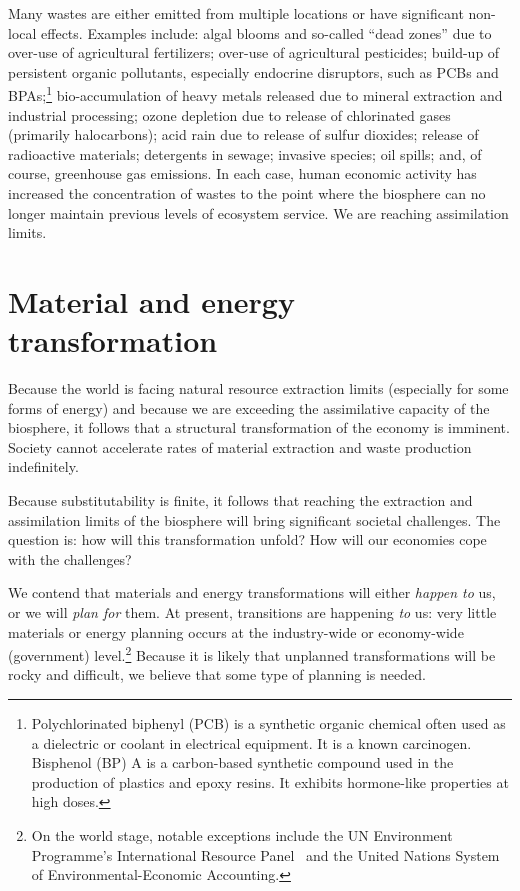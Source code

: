 Many wastes are either emitted from multiple locations or have 
significant non-local effects. 
Examples include:
algal blooms and so-called ``dead zones'' due to over-use of agricultural fertilizers;
over-use of agricultural pesticides;
build-up of persistent organic pollutants, especially endocrine disruptors, such as PCBs 
	and BPAs;\footnote{Polychlorinated biphenyl (PCB) 
		is a synthetic organic chemical often used as 
		a dielectric or coolant in electrical equipment.
		It is a known carcinogen.
		Bisphenol (BP) A is a carbon-based synthetic compound used in the production
		of plastics and epoxy resins. It exhibits hormone-like properties at high doses.
		}
bio-accumulation of heavy metals released due to mineral extraction and industrial processing;
ozone depletion due to release of chlorinated gases (primarily halocarbons);
acid rain due to release of sulfur dioxides;
release of radioactive materials;
detergents in sewage;
invasive species;
oil spills;
and, of course, greenhouse gas emissions.\cite{UNMEA2005, Butler1978, Walker2012}
In each case, human economic activity has increased the concentration
of wastes to the point where the biosphere can no longer maintain 
previous levels of ecosystem service.
We are reaching assimilation limits.


\section{Material and energy transformation}

Because the world is facing natural resource extraction limits
(especially for some forms of energy)
and because we are exceeding the assimilative capacity of the biosphere,
it follows that a structural transformation of the economy is imminent.
Society cannot accelerate rates of material extraction
and waste production indefinitely.

Because substitutability is finite, 
it follows that reaching the extraction and assimilation limits 
of the biosphere will bring significant societal challenges.
The question is: how will this transformation unfold?
How will our economies cope with the challenges?

We contend that materials and energy transformations will either  
\emph{happen to} us, or we will \emph{plan for} them.
At present,
transitions are happening \emph{to} us:
very little materials or energy planning occurs
at the industry-wide or economy-wide (government) level.\footnote{On the world stage, 
	notable exceptions include the UN Environment Programme's 
	International Resource Panel~\cite{UNEP-IRP:aa}
	and the United Nations System of Environmental-Economic Accounting.\cite{UNSEEAWeb}
	}
Because it is likely that unplanned transformations will be rocky and difficult,
we believe that some type of planning is needed.

